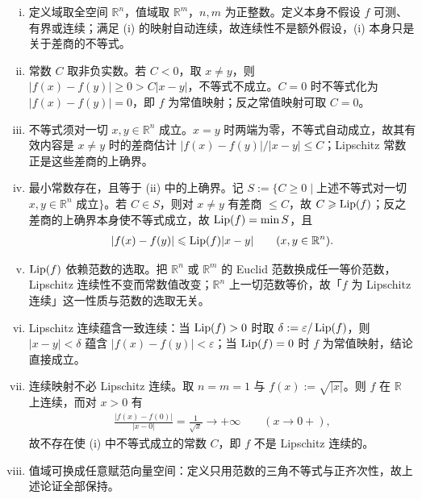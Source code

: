 \documentclass[../../main.tex]{subfiles}%
\begin{document}
\begin{remark}\label{remark:ch02-def-2-4-条件}
\begin{enumerate}[(i)]
\item 定义域取全空间 $\mathbb{R}^n$，值域取 $\mathbb{R}^m$，$n,m$ 为正整数。定义本身不假设 $f$ 可测、有界或连续；满足 (i) 的映射自动连续，故连续性不是额外假设，(i) 本身只是关于差商的不等式。
\item 常数 $C$ 取非负实数。若 $C<0$，取 $x\neq y$，则 $\lvert f(x)-f(y)\rvert\geqslant0>C\lvert x-y\rvert$，不等式不成立。$C=0$ 时不等式化为 $\lvert f(x)-f(y)\rvert=0$，即 $f$ 为常值映射；反之常值映射可取 $C=0$。
\item 不等式须对一切 $x,y\in\mathbb{R}^n$ 成立。$x=y$ 时两端为零，不等式自动成立，故其有效内容是 $x\neq y$ 时的差商估计 $\lvert f(x)-f(y)\rvert/\lvert x-y\rvert\leqslant C$；Lipschitz 常数正是这些差商的上确界。
\item 最小常数存在，且等于 (ii) 中的上确界。记 $S:=\{C\geqslant0\mid$上述不等式对一切 $x,y\in\mathbb{R}^n$ 成立$\}$。若 $C\in S$，则对 $x\neq y$ 有差商 $\leqslant C$，故 $C\geqslant\operatorname{Lip}(f)$；反之差商的上确界本身使不等式成立，故 $\operatorname{Lip}(f)=\min S$，且
\begin{align*}
\lvert f(x)-f(y)\rvert\leqslant\operatorname{Lip}(f)\lvert x-y\rvert\qquad(x,y\in\mathbb{R}^n).
\end{align*}
\item $\operatorname{Lip}(f)$ 依赖范数的选取。把 $\mathbb{R}^n$ 或 $\mathbb{R}^m$ 的 Euclid 范数换成任一等价范数，Lipschitz 连续性不变而常数值改变；$\mathbb{R}^n$ 上一切范数等价，故「$f$ 为 Lipschitz 连续」这一性质与范数的选取无关。
\item Lipschitz 连续蕴含一致连续：当 $\operatorname{Lip}(f)>0$ 时取 $\delta:=\varepsilon/\operatorname{Lip}(f)$，则 $\lvert x-y\rvert<\delta$ 蕴含 $\lvert f(x)-f(y)\rvert<\varepsilon$；当 $\operatorname{Lip}(f)=0$ 时 $f$ 为常值映射，结论直接成立。
\item 连续映射不必 Lipschitz 连续。取 $n=m=1$ 与 $f(x):=\sqrt{\lvert x\rvert}$。则 $f$ 在 $\mathbb{R}$ 上连续，而对 $x>0$ 有
\begin{align*}
\frac{\lvert f(x)-f(0)\rvert}{\lvert x-0\rvert}=\frac{1}{\sqrt{x}}\longrightarrow+\infty\qquad(x\to0+),
\end{align*}
故不存在使 (i) 中不等式成立的常数 $C$，即 $f$ 不是 Lipschitz 连续的。
\item 值域可换成任意赋范向量空间：定义只用范数的三角不等式与正齐次性，故上述论证全部保持。
\end{enumerate}
\end{remark}
\end{document}
